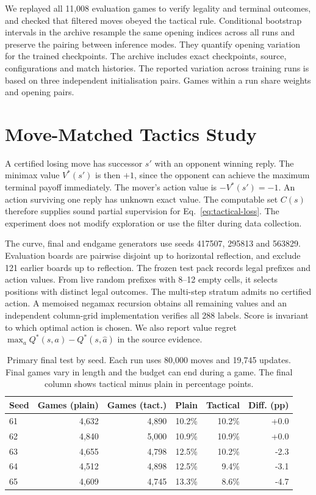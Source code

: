 \documentclass[letterpaper]{article}
\begin{document}
We replayed all 11,008 evaluation games to verify legality and terminal
outcomes, and checked that filtered moves obeyed the tactical rule. Conditional
bootstrap intervals in the archive resample the same opening indices across
all runs and preserve the pairing between inference modes. They quantify
opening variation for the trained checkpoints. The archive
includes exact checkpoints, source, configurations and match histories.
The reported variation across training runs is based on three independent
initialisation pairs. Games within a run share weights and opening pairs.

\clearpage
\section{Move-Matched Tactics Study}
\label{app:tactical-study}
A certified losing move has successor $s'$ with an opponent winning reply.
The minimax value $V^*(s')$ is then $+1$, since the opponent can achieve
the maximum terminal payoff immediately. The mover's action value is
$-V^*(s')=-1$. An action surviving one reply has unknown exact value. The
computable set $C(s)$ therefore supplies sound partial supervision for
Eq.~\eqref{eq:tactical-loss}. The experiment does not modify exploration
or use the filter during data collection.

The curve, final and endgame generators use seeds 417507, 295813 and
563829. Evaluation boards are pairwise disjoint up to horizontal reflection,
and exclude 121 earlier boards up to reflection. The frozen test pack
records legal prefixes and action values. From live random prefixes with
8--12 empty cells, it selects positions with distinct legal outcomes.
The multi-step stratum admits no certified action. A memoised negamax
recursion obtains all remaining values and an independent column-grid
implementation verifies all 288 labels. Score is invariant to which
optimal action is chosen. We also report value regret
$\max_aQ^*(s,a)-Q^*(s,\hat a)$ in the source evidence.

\begin{table}[!htbp]
\centering\small
\caption{Primary final test by seed. Each run uses 80,000 moves and 19,745 updates. Final games vary in length and the budget can end during a game. The final column shows tactical minus plain in percentage points.}
\label{tab:tactical-seeds}
\begin{tabular}{@{}lrrrrr@{}}
\toprule
Seed & Games (plain) & Games (tact.) & Plain & Tactical & Diff. (pp)\\
\midrule
61 & 4,632 & 4,890 & 10.2\% & 10.2\% & +0.0\\
62 & 4,840 & 5,000 & 10.9\% & 10.9\% & +0.0\\
63 & 4,655 & 4,798 & 12.5\% & 10.2\% & -2.3\\
64 & 4,512 & 4,898 & 12.5\% & 9.4\% & -3.1\\
65 & 4,609 & 4,745 & 13.3\% & 8.6\% & -4.7\\
\bottomrule
\end{tabular}
\end{table}
\end{document}
